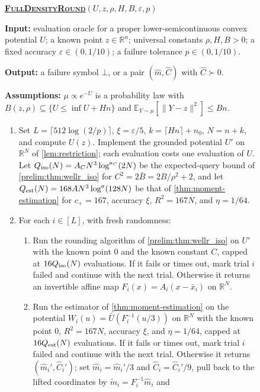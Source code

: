 \documentclass[11pt]{article}
\numberwithin{equation}{section}
\newenvironment{fminipage}%
  {\begin{Sbox}\begin{minipage}}%
  {\end{minipage}\end{Sbox}\fbox{\TheSbox}}
\newenvironment{algbox}[0]{\vskip 0.2in
\noindent
\begin{fminipage}{6.3in}
}{
\end{fminipage}
\vskip 0.2in
}
\theoremstyle{definition}
\newcommand{\eps}{\varepsilon}
\newcommand{\R}{\mathbb{R}}
\newcommand{\E}[2]{\mathbb{E}_{#1}\left[#2\right]}
\newcommand{\algname}[1]{\textnormal{\textsc{#1}}}
\begin{document}
\begin{figure}[H]
\begin{algbox}
\textbf{\uline{\algname{FullDensityRound}}}$(U,z,\rho,H,B,\eps,p)$

\textbf{Input:} evaluation oracle for a proper lower-semicontinuous convex
potential $U$; a known point
$z\in\R^n$; universal constants
$\rho,H,B>0$; a fixed accuracy
$\eps\in(0,1/10)$; a failure tolerance
$p\in(0,1/10)$.

\textbf{Output:} a failure symbol $\bot$, or a pair
$(\widehat m,\widehat C)$ with
$\widehat C\succ0$.

\textbf{Assumptions:} $\mu\propto e^{-U}$ is a probability law with
$B(z,\rho)\subseteq\{U\leq\inf U+Hn\}$ and
$\E{Y\sim\mu}{\|Y-z\|^2}\leq Bn$.

\begin{enumerate}[leftmargin=*,itemsep=2pt]
\item Set $L=\lceil512\log(2/p)\rceil$,
  $\xi=\eps/5$,
  $k=\lceil Hn\rceil+n_0$,
  $N=n+k$, and compute
  $U(z)$.
  Implement the grounded potential $U'$ on
  $\R^N$ of \cref{lem:restriction}; each evaluation costs one evaluation of
  $U$.
  Let $Q_{\rm iso}(N)=A_CN^3\log^{a_C}(2N)$ be the expected-query bound of
  \cref{prelim:thm:wellr_iso} for
  $C^2=2\bar B=2B/\rho^2+2$, and let
  $Q_{\rm est}(N)=168AN^3\log^a(128N)$ be that of \cref{thm:moment-estimation}
  for
  $c_+=167$, accuracy
  $\xi$,
  $R^2=167N$, and
  $\eta=1/64$.
\item For each $i\in[L]$, with fresh randomness:
  \begin{enumerate}[itemsep=1pt]
\item Run the rounding algorithm of \cref{prelim:thm:wellr_iso} on
  $U'$ with the known point
  $0$ and the known constant
  $C$, capped at
  $16Q_{\rm iso}(N)$ evaluations.
  If it fails or times out, mark trial $i$ failed
  and continue with the next trial.
  Otherwise it returns an invertible affine map $F_i(x)=A_i(x-\bar x_i)$ on
  $\R^N$.
\item Run the estimator of \cref{thm:moment-estimation} on the potential
  $W_i(u)=\bar U(F_i^{-1}(u/3))$ on
  $\R^N$ with the known point
  $0$,
  $R^2=167N$, accuracy
  $\xi$, and
  $\eta=1/64$, capped at
  $16Q_{\rm est}(N)$ evaluations.
  If it fails or times out, mark trial $i$ failed
  and continue with the next trial.
  Otherwise it returns $(\widehat m_i',\widehat C_i')$; set
  $\widehat m_i=\widehat m_i'/3$ and
  $\widehat C_i=\widehat C_i'/9$, pull back to the lifted coordinates by
  $\widetilde m_i=F_i^{-1}\widehat m_i$ and

\end{enumerate}
\end{enumerate}
\end{algbox}
\end{figure}
\end{document}
